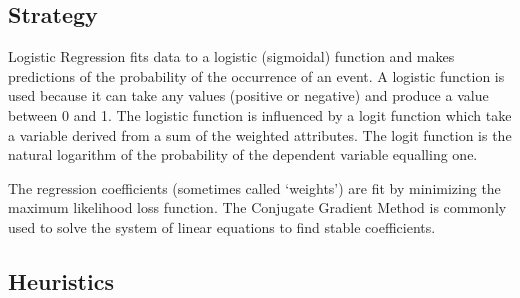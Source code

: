 \subsection{Strategy}
Logistic Regression fits data to a logistic (sigmoidal) function and makes predictions of the probability of the occurrence of an event. 
A logistic function is used because it can take any values (positive or negative) and produce a value between 0 and 1. The logistic function is influenced by a logit function which take a variable derived from a sum of the weighted attributes. The logit function is the natural logarithm of the probability of the dependent variable equalling one.

The regression coefficients (sometimes called `weights') are fit by minimizing the maximum likelihood loss function. The Conjugate Gradient Method is commonly used to solve the system of linear equations to find stable coefficients.

\subsection{Heuristics}

